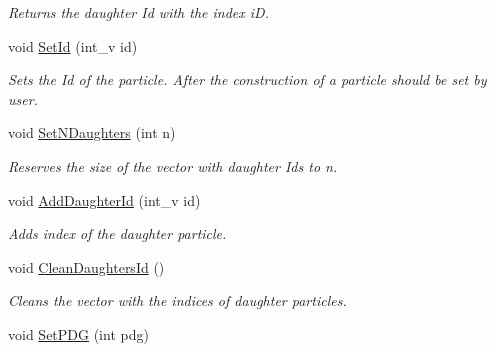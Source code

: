 \begin{DoxyCompactItemize}
\begin{DoxyCompactList}\small\item\em Returns the daughter Id with the index iD. \end{DoxyCompactList}\item 
void \hyperlink{classKFParticleBaseSIMD_a81cd387d3cf24a498205ebb4bea5e9ff}{Set\+Id} (int\+\_\+v id)\hypertarget{classKFParticleBaseSIMD_a81cd387d3cf24a498205ebb4bea5e9ff}{}\label{classKFParticleBaseSIMD_a81cd387d3cf24a498205ebb4bea5e9ff}

\begin{DoxyCompactList}\small\item\em Sets the Id of the particle. After the construction of a particle should be set by user. \end{DoxyCompactList}\item 
void \hyperlink{classKFParticleBaseSIMD_a2ae7f872e011430fb8db5eae6488e776}{Set\+N\+Daughters} (int n)\hypertarget{classKFParticleBaseSIMD_a2ae7f872e011430fb8db5eae6488e776}{}\label{classKFParticleBaseSIMD_a2ae7f872e011430fb8db5eae6488e776}

\begin{DoxyCompactList}\small\item\em Reserves the size of the vector with daughter Ids to n. \end{DoxyCompactList}\item 
void \hyperlink{classKFParticleBaseSIMD_a7e60f55ad9b21a9a196c3ad08a46a52d}{Add\+Daughter\+Id} (int\+\_\+v id)\hypertarget{classKFParticleBaseSIMD_a7e60f55ad9b21a9a196c3ad08a46a52d}{}\label{classKFParticleBaseSIMD_a7e60f55ad9b21a9a196c3ad08a46a52d}

\begin{DoxyCompactList}\small\item\em Adds index of the daughter particle. \end{DoxyCompactList}\item 
void \hyperlink{classKFParticleBaseSIMD_a3eeb37388f866c06bee751d3ac31f9da}{Clean\+Daughters\+Id} ()\hypertarget{classKFParticleBaseSIMD_a3eeb37388f866c06bee751d3ac31f9da}{}\label{classKFParticleBaseSIMD_a3eeb37388f866c06bee751d3ac31f9da}

\begin{DoxyCompactList}\small\item\em Cleans the vector with the indices of daughter particles. \end{DoxyCompactList}\item 
void \hyperlink{classKFParticleBaseSIMD_a86e624a4194a7de352389e659b720f90}{Set\+P\+DG} (int pdg)\hypertarget{classKFParticleBaseSIMD_a86e624a4194a7de352389e659b720f90}{}\label{classKFParticleBaseSIMD_a86e624a4194a7de352389e659b720f90}


\end{DoxyCompactItemize}
